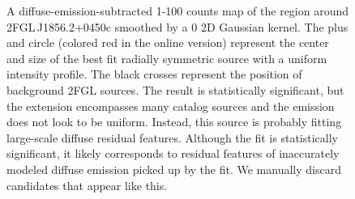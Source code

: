 \documentclass[12pt,preprint]{aastex}
\newif\ifcolorfigure
\newcommand{\gev}{\text{GeV}\xspace}
\begin{document}
\clearpage
\begin{figure}
    \ifcolorfigure
    \plotone{source_plots/example_bad_fit_color.eps}
    \else
    \fi
    \caption{
    A diffuse-emission-subtracted 1-100 \gev counts map of the region
    around 2FGL\,J1856.2+0450c smoothed by a 0 2D Gaussian kernel. The
    plus and circle (colored red in the online version) represent the
    center and size of the best fit radially symmetric source with
    a uniform intensity profile.  The black crosses represent the
    position of background 2FGL sources.  The result is statistically
    significant, but the extension encompasses many catalog sources and
    the emission does not look to be uniform. Instead, this source is
    probably fitting large-scale diffuse residual features. Although
    the fit is statistically significant, it likely corresponds to
    residual features of inaccurately modeled diffuse emission picked
    up by the fit.  We manually discard candidates that appear like this.
    }
    \label{example_bad_fit}
\end{figure}
\end{document}
